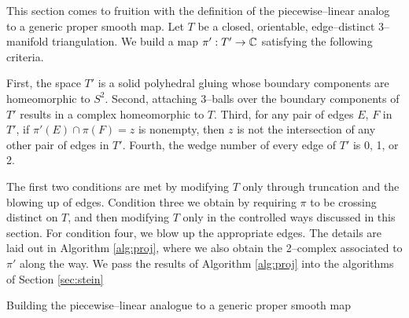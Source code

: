 This section comes to fruition with the definition of the piecewise--linear analog to a generic proper smooth map.
Let $T$ be a closed, orientable, edge--distinct 3--manifold triangulation.
We build a map $\pi':T'\to\mathbb{C}$ satisfying the following criteria.

First, the space $T'$ is a solid polyhedral gluing whose boundary components are homeomorphic to $S^2$.
Second, attaching 3--balls over the boundary components of $T'$ results in a complex homeomorphic to $T$.
Third, for any pair of edges $E$, $F$ in $T'$, if $\pi'(E)\cap\pi(F)=z$ is nonempty, then $z$ is not the intersection of any other pair of edges in $T'$.
Fourth, the wedge number of every edge of $T'$ is 0, 1, or 2.

The first two conditions are met by modifying $T$ only through truncation and the blowing up of edges.
Condition three we obtain by requiring $\pi$ to be crossing distinct on $T$, and then modifying $T$ only in the controlled ways discussed in this section.
For condition four, we blow up the appropriate edges.
The details are laid out in Algorithm \ref{alg:proj}, where we also obtain the 2--complex associated to $\pi'$ along the way.
We pass the results of Algorithm \ref{alg:proj} into the algorithms of Section \ref{sec:stein}

\begin{algorithm}
	\caption{Building the piecewise--linear analogue to a generic proper smooth map}
	\label{alg:proj}
\end{algorithm}